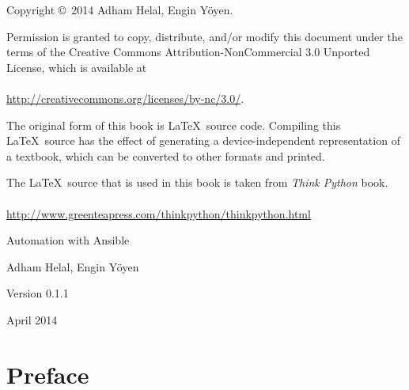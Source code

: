 \documentclass[10pt]{book}
\newcommand{\thetitle}{Automation with Ansible}
\newcommand{\theversion}{0.1.1}
\newcommand{\thedate}{April 2014}
\begin{document}
\begin{latexonly}

\pagebreak
\thispagestyle{empty}

{\small
Copyright \copyright~2014 Adham Helal, Engin Yöyen.


\vspace{0.2in}



Permission is granted to copy, distribute, and/or modify this document
under the terms of the Creative Commons Attribution-NonCommercial 3.0 Unported
License, which is available at 
\\
\\
\url{http://creativecommons.org/licenses/by-nc/3.0/}.

The original form of this book is \LaTeX\ source code.  Compiling this
\LaTeX\ source has the effect of generating a device-independent
representation of a textbook, which can be converted to other formats
and printed. 

The \LaTeX\ source that is used in this book is taken from \emph{Think Python} book.
\\
\\
\url{http://www.greenteapress.com/thinkpython/thinkpython.html}




\vspace{0.2in}

} %

\end{latexonly}



\begin{htmlonly}


{\Large \thetitle}

{\large Adham Helal, Engin Yöyen}

Version \theversion

\thedate

\setcounter{chapter}{-1}

\end{htmlonly}

\fi



\chapter{Preface}
\end{document}
